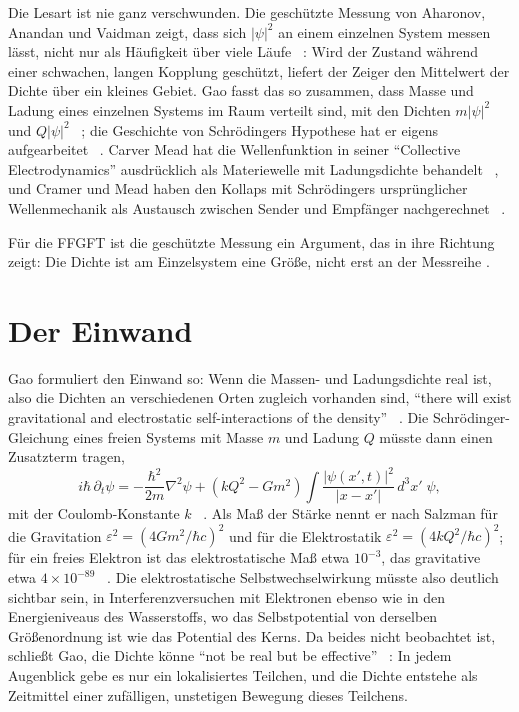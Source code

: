 Die Lesart ist nie ganz verschwunden. Die geschützte Messung von Aharonov, Anandan und Vaidman zeigt,
dass sich $|\psi|^2$ an einem einzelnen System messen lässt, nicht nur als Häufigkeit über viele
Läufe \QM~\cite{AharonovVaidman1993,AAV1993}: Wird der Zustand während einer schwachen, langen
Kopplung geschützt, liefert der Zeiger den Mittelwert der Dichte über ein kleines Gebiet. Gao fasst
das so zusammen, dass Masse und Ladung eines einzelnen Systems im Raum verteilt sind, mit den
Dichten $m|\psi|^2$ und $Q|\psi|^2$ \QM~\cite{Gao2011}; die Geschichte von Schrödingers Hypothese hat er
eigens aufgearbeitet \QM~\cite{Gao2017}. Carver Mead hat die Wellenfunktion in seiner
\enquote{Collective Electrodynamics} ausdrücklich als Materiewelle mit Ladungsdichte behandelt
\QM~\cite{Mead2000}, und Cramer und Mead haben den Kollaps mit Schrödingers ursprünglicher
Wellenmechanik als Austausch zwischen Sender und Empfänger nachgerechnet \QM~\cite{CramerMead2020}.

Für die FFGFT ist die geschützte Messung ein Argument, das in ihre Richtung zeigt: Die Dichte ist am
Einzelsystem eine Größe, nicht erst an der Messreihe \SM.

\section{Der Einwand}

Gao formuliert den Einwand so: Wenn die Massen- und Ladungsdichte real ist, also die Dichten an
verschiedenen Orten zugleich vorhanden sind, \enquote{there will exist gravitational and
electrostatic self-interactions of the density} \QM~\cite{Gao2011}. Die Schrödinger-Gleichung eines
freien Systems mit Masse $m$ und Ladung $Q$ müsste dann einen Zusatzterm tragen,
\begin{equation}
  i\hbar\,\partial_t\psi=-\frac{\hbar^2}{2m}\nabla^2\psi
  +\left(kQ^2-Gm^2\right)\!\int\!\frac{|\psi(x',t)|^2}{|x-x'|}\,d^3x'\;\psi ,
  \label{eq:gao}
\end{equation}
mit der Coulomb-Konstante $k$ \QM~\cite{Gao2011}. Als Maß der Stärke nennt er nach Salzman für die
Gravitation $\varepsilon^2=(4Gm^2/\hbar c)^2$ und für die Elektrostatik $\varepsilon^2=(4kQ^2/\hbar
c)^2$; für ein freies Elektron ist das elektrostatische Maß etwa $10^{-3}$, das gravitative etwa
$4\times10^{-89}$ \QM~\cite{Gao2011,Salzman2005}. Die elektrostatische Selbstwechselwirkung
müsste also deutlich sichtbar sein, in Interferenzversuchen mit Elektronen ebenso wie in den
Energieniveaus des Wasserstoffs, wo das Selbstpotential von derselben Größenordnung ist wie das
Potential des Kerns. Da beides nicht beobachtet ist, schließt Gao, die Dichte könne
\enquote{not be real but be effective} \QM~\cite{Gao2011}: In jedem Augenblick gebe es nur ein
lokalisiertes Teilchen, und die Dichte entstehe als Zeitmittel einer zufälligen, unstetigen Bewegung
dieses Teilchens.


